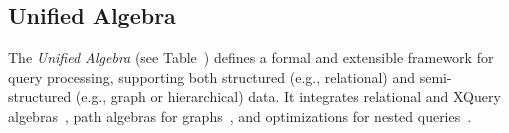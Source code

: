 

\subsection{Unified Algebra}




The \textit{Unified Algebra} (see Table~) defines a formal and extensible framework for query processing, supporting both structured (e.g., relational) and semi-structured (e.g., graph or hierarchical) data. It integrates relational and XQuery algebras~\citep{DBLP:conf/icde/ReSF06}, path algebras for graphs~\citep{DBLP:conf/edbt/AnglesBGV25}, and optimizations for nested queries~\citep{DBLP:conf/sigmod/HolschGS16}.


